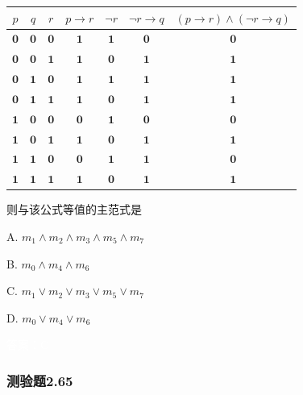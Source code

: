 \documentclass[UTF8, heading=true]{ctexart}
\begin{document}
\begin{table}[H]
  \centering
\begin{tabular}{c|c|c|c|c|c|c}
\hline$p$ & $q$ & $r$ & $p \rightarrow r$ & $\neg r$ & $\neg r \rightarrow q$ & $(p \rightarrow r) \wedge(\neg r \rightarrow q)$ \\
\hline $\mathbf{0}$ & $\mathbf{0}$ & $\mathbf{0}$ & $\mathbf{1}$ & $\mathbf{1}$ & $\mathbf{0}$ & $\mathbf{0}$ \\
\hline $\mathbf{0}$ & $\mathbf{0}$ & $\mathbf{1}$ & $\mathbf{1}$ & $\mathbf{0}$ & $\mathbf{1}$ & $\mathbf{1}$ \\
\hline $\mathbf{0}$ & $\mathbf{1}$ & $\mathbf{0}$ & $\mathbf{1}$ & $\mathbf{1}$ & $\mathbf{1}$ & $\mathbf{1}$ \\
\hline $\mathbf{0}$ & $\mathbf{1}$ & $\mathbf{1}$ & $\mathbf{1}$ & $\mathbf{0}$ & $\mathbf{1}$ & $\mathbf{1}$ \\
\hline $\mathbf{1}$ & $\mathbf{0}$ & $\mathbf{0}$ & $\mathbf{0}$ & $\mathbf{1}$ & $\mathbf{0}$ & $\mathbf{0}$ \\
\hline $\mathbf{1}$ & $\mathbf{0}$ & $\mathbf{1}$ & $\mathbf{1}$ & $\mathbf{0}$ & $\mathbf{1}$ & $\mathbf{1}$ \\
\hline $\mathbf{1}$ & $\mathbf{1}$ & $\mathbf{0}$ & $\mathbf{0}$ & $\mathbf{1}$ & $\mathbf{1}$ & $\mathbf{0}$ \\
\hline $\mathbf{1}$ & $\mathbf{1}$ & $\mathbf{1}$ & $\mathbf{1}$ & $\mathbf{0}$ & $\mathbf{1}$ & $\mathbf{1}$ \\
\hline
\end{tabular}
\end{table}

则与该公式等值的主范式是

A. $
m_1 \wedge m_2 \wedge m_3 \wedge m_5 \wedge m_7
$

B. $m_0 \wedge m_4 \wedge m_6$

C. $m_1 \vee m_2 \vee m_3 \vee m_5 \vee m_7$

D. $m_0 \vee m_4 \vee m_6$

\textcolor{white}{答案：C}

\subsubsection{测验题2.65}
\end{document}
